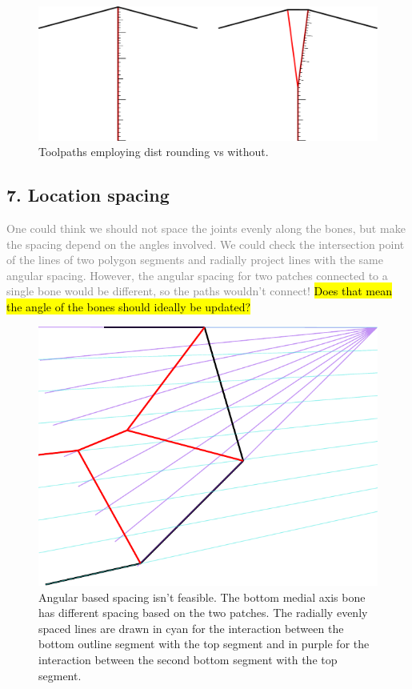 \begin{figure}[H]
\includegraphics[width=\columnwidth]{sources/method/heterogeneous_joint_generation.pdf}
\caption{Toolpaths employing dist rounding vs without.}
\label{heterogeneous_joint_generation}
\end{figure}






\subsection{7. Location spacing}
\textcolor{gray}{
One could think we should not space the joints evenly along the bones, but make the spacing depend on the angles involved.
We could check the intersection point of the lines of two polygon segments and radially project lines with the same angular spacing.
However, the angular spacing for two patches connected to a single bone would be different, so the paths wouldn't connect!
\hl{Does that mean the angle of the bones should ideally be updated?}
}

\begin{figure}[H]
\centering
\includegraphics[width=.5\columnwidth]{sources/method/angular_based_spacing.pdf}
\caption{Angular based spacing isn't feasible. The bottom medial axis bone has different spacing based on the two patches. The radially evenly spaced lines are drawn in cyan for the interaction between the bottom outline segment with the top segment and in purple for the interaction between the second bottom segment with  the top segment.}
\label{angular_based_spacing}
\end{figure}


